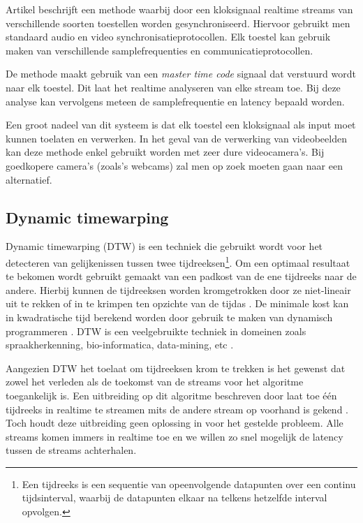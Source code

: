 Artikel \cite{jaimovich2010synchronization} beschrijft een methode waarbij door een kloksignaal realtime streams van verschillende soorten toestellen worden gesynchroniseerd. Hiervoor gebruikt men standaard audio en video synchronisatieprotocollen. Elk toestel kan gebruik maken van verschillende samplefrequenties en communicatieprotocollen.

De methode maakt gebruik van een \textit{master time code} signaal dat verstuurd wordt naar elk toestel. Dit laat het realtime analyseren van elke stream toe. Bij deze analyse kan vervolgens meteen de samplefrequentie en latency bepaald worden. 

Een groot nadeel van dit systeem is dat elk toestel een kloksignaal als input moet kunnen toelaten en verwerken. In het geval van de verwerking van videobeelden kan deze methode enkel gebruikt worden met zeer dure videocamera's. Bij goedkopere camera's (zoals's webcams) zal men op zoek moeten gaan naar een alternatief. \cite{six2015multimodal}



\subsection{Dynamic timewarping}

Dynamic timewarping (DTW) is een techniek die gebruikt wordt voor het detecteren van gelijkenissen tussen twee tijdreeksen\footnote{Een tijdreeks is een sequentie van opeenvolgende datapunten over een continu tijdsinterval, waarbij de datapunten elkaar na telkens hetzelfde interval opvolgen.}. Om een optimaal resultaat te bekomen wordt gebruikt gemaakt van een padkost van de ene tijdreeks naar de andere. Hierbij kunnen de tijdreeksen worden kromgetrokken door ze niet-lineair uit te rekken of in te krimpen ten opzichte van de tijdas \cite{salvador2007toward}. De minimale kost kan in kwadratische tijd berekend worden door gebruik te maken van dynamisch programmeren \cite{dixon2005live}. DTW is een veelgebruikte techniek in domeinen zoals spraakherkenning, bio-informatica, data-mining, etc \cite{ratanamahatana2004everything}.

Aangezien DTW het toelaat om tijdreeksen krom te trekken is het gewenst dat zowel het verleden als de toekomst van de streams voor het algoritme toegankelijk is. Een uitbreiding op dit algoritme beschreven door \citeauthor{dixon2005live} laat toe één tijdreeks in realtime te streamen mits de andere stream op voorhand is gekend \cite{dixon2005live}. Toch houdt deze uitbreiding geen oplossing in voor het gestelde probleem. Alle streams komen immers in realtime toe en we willen zo snel mogelijk de latency tussen de streams achterhalen.

